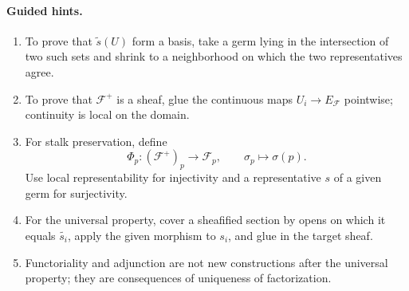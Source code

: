 \paragraph{Guided hints.}
\begin{enumerate}
\item To prove that $\widetilde s(U)$ form a basis, take a germ lying in the intersection of
two such sets and shrink to a neighborhood on which the two representatives agree.
\item To prove that $\mathcal F^+$ is a sheaf, glue the continuous maps
$U_i\to E_{\mathcal F}$ pointwise; continuity is local on the domain.
\item For stalk preservation, define
\[
\Phi_p:(\mathcal F^+)_p\to\mathcal F_p,
\qquad
\sigma_p\mapsto\sigma(p).
\]
Use local representability for injectivity and a representative $s$ of a given germ for
surjectivity.
\item For the universal property, cover a sheafified section by opens on which it equals
$\widetilde{s_i}$, apply the given morphism to $s_i$, and glue in the target sheaf.
\item Functoriality and adjunction are not new constructions after the universal property;
they are consequences of uniqueness of factorization.
\end{enumerate}

